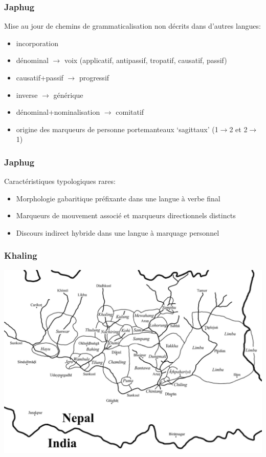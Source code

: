 \documentclass[xcolor=table]{beamer}
\begin{document}
\begin{frame} 
\frametitle{Japhug}
Mise au jour de chemins de grammaticalisation non décrits dans d'autres langues:
\begin{itemize}[<+->]
\item incorporation
\item dénominal $\rightarrow$ voix (applicatif, antipassif, tropatif, causatif, passif)
\item causatif+passif $\rightarrow$ progressif
\item inverse $\rightarrow$ générique
\item dénominal+nominalisation $\rightarrow$  comitatif
\item origine des marqueurs de personne portemanteaux `sagittaux' (1$\rightarrow$2 et 2$\rightarrow$1)
\end{itemize}
\end{frame} 


\begin{frame} 
\frametitle{Japhug}
Caractéristiques typologiques rares:
\begin{itemize}[<+->]
\item Morphologie gabaritique préfixante dans une langue à verbe final
\item Marqueurs de mouvement associé et marqueurs directionnels distincts
\item Discours indirect hybride dans une langue à marquage personnel
\end{itemize}
\end{frame} 

\begin{frame} 
\frametitle{Khaling}

\includegraphics[width=1\textwidth]{Kirant.jpeg} 
\end{frame} 
\end{document}
